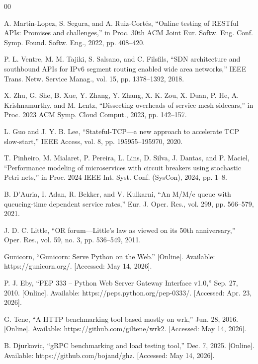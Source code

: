 \documentclass{ieeeaccess}
\begin{document}
\begin{thebibliography}{00}

 A. Martin-Lopez, S. Segura, and A. Ruiz-Cortés, ``Online testing of RESTful APIs: Promises and challenges,'' in Proc. 30th ACM Joint Eur. Softw. Eng. Conf. Symp. Found. Softw. Eng., 2022, pp. 408--420.

 P. L. Ventre, M. M. Tajiki, S. Salsano, and C. Filsfils, ``SDN architecture and southbound APIs for IPv6 segment routing enabled wide area networks,'' IEEE Trans. Netw. Service Manag., vol. 15, pp. 1378--1392, 2018.

 X. Zhu, G. She, B. Xue, Y. Zhang, Y. Zhang, X. K. Zou, X. Duan, P. He, A. Krishnamurthy, and M. Lentz, ``Dissecting overheads of service mesh sidecars,'' in Proc. 2023 ACM Symp. Cloud Comput., 2023, pp. 142--157.

 L. Guo and J. Y. B. Lee, ``Stateful-TCP—a new approach to accelerate TCP slow-start,'' IEEE Access, vol. 8, pp. 195955--195970, 2020.

 T. Pinheiro, M. Mialaret, P. Pereira, L. Lins, D. Silva, J. Dantas, and P. Maciel, ``Performance modeling of microservices with circuit breakers using stochastic Petri nets,'' in Proc. 2024 IEEE Int. Syst. Conf. (SysCon), 2024, pp. 1--8.

 B. D'Auria, I. Adan, R. Bekker, and V. Kulkarni, ``An M/M/c queue with queueing-time dependent service rates,'' Eur. J. Oper. Res., vol. 299, pp. 566--579, 2021.

 J. D. C. Little, ``OR forum—Little's law as viewed on its 50th anniversary,'' Oper. Res., vol. 59, no. 3, pp. 536--549, 2011.

 Gunicorn, ``Gunicorn: Serve Python on the Web.'' [Online]. Available: https://gunicorn.org/. [Accessed: May 14, 2026].

 P. J. Eby, ``PEP 333 – Python Web Server Gateway Interface v1.0,'' Sep. 27, 2010. [Online]. Available: https://peps.python.org/pep-0333/. [Accessed: Apr. 23, 2026].

 G. Tene, ``A HTTP benchmarking tool based mostly on wrk,'' Jun. 28, 2016. [Online]. Available: https://github.com/giltene/wrk2. [Accessed: May 14, 2026].

 B. Djurkovic, ``gRPC benchmarking and load testing tool,'' Dec. 7, 2025. [Online]. Available: https://github.com/bojand/ghz. [Accessed: May 14, 2026].


\end{thebibliography}
\end{document}
